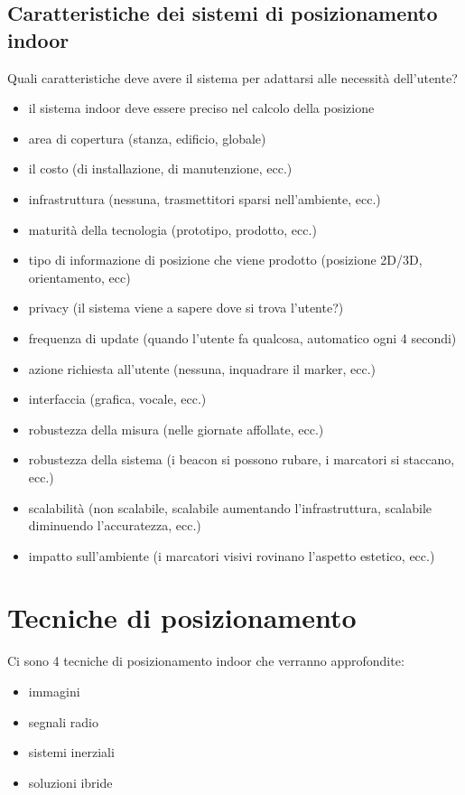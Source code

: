 \subsection{Caratteristiche dei sistemi di posizionamento indoor}
Quali caratteristiche deve avere il sistema per adattarsi alle necessità dell'utente?
\begin{itemize}
    \item il sistema indoor deve essere preciso nel calcolo della posizione
    \item area di copertura (stanza, edificio, globale)
    \item il costo (di installazione, di manutenzione, ecc.)
    \item infrastruttura (nessuna, trasmettitori sparsi nell'ambiente, ecc.)
    \item maturità della tecnologia (prototipo, prodotto, ecc.)
    \item tipo di informazione di posizione che viene prodotto (posizione 2D/3D, orientamento, ecc)
    \item privacy (il sistema viene a sapere dove si trova l'utente?)
    \item frequenza di update (quando l'utente fa qualcosa, automatico ogni 4 secondi)
    \item azione richiesta all’utente (nessuna, inquadrare il marker, ecc.)
    \item interfaccia (grafica, vocale, ecc.)
    \item robustezza della misura (nelle giornate affollate, ecc.)
    \item robustezza della sistema (i beacon si possono rubare, i marcatori si staccano, ecc.)
    \item scalabilità (non scalabile, scalabile aumentando l’infrastruttura, scalabile diminuendo l’accuratezza, ecc.)
    \item impatto sull'ambiente (i marcatori visivi rovinano l’aspetto estetico, ecc.)
\end{itemize}

\section{Tecniche di posizionamento}
Ci sono 4 tecniche di posizionamento indoor che verranno approfondite:
\begin{itemize}
    \item immagini
    \item segnali radio
    \item sistemi inerziali
    \item soluzioni ibride
\end{itemize}


